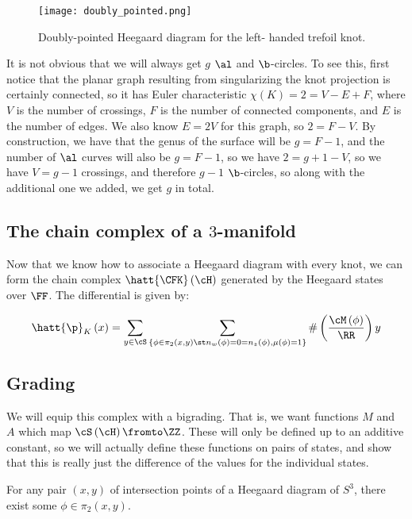 \documentclass{amsproc}
\begin{document}
\begin{figure}
\texttt{[image: doubly\_pointed.png]}
\caption{Doubly-pointed Heegaard diagram for the left-
handed trefoil knot.}
\label{fig:doubly_pointed}
\end{figure}

It is not obvious that we will always get $g$ $\al$ and $\b$-circles.
To see this, first notice that the planar graph resulting from singularizing the knot projection
is certainly connected, so it has Euler characteristic
$\chi\left( K \right) = 2 = V - E + F$, where $V$ is the number of crossings, 
$F$ is the number of connected components, and $E$ is the number of edges. 
We also know $E = 2V$ for this graph, so $2 = F - V$. By construction, we have that the genus of the
surface will be $g = F - 1$, and the number of $\al$ curves will also be $g = F-1$, so we have
$2 = g + 1 - V$, so we have $V = g - 1$ crossings, and therefore $g - 1$ $\b$-circles, so along with
the additional one we added, we get $g$ in total.

\subsection{The chain complex of a $3$-manifold}

Now that we know how to associate a Heegaard diagram with every knot, we can form
the chain complex $\hatt{\CFK}\left( \cH \right)$ generated by the Heegaard states
over $\FF$. The differential is given by:

\begin{equation}
\hatt{\p}_K\left( x \right) = 
\sum_{y\in \cS} \sum_{ \left\{ \phi \in \pi_2\left( x , y \right) \st
n_w\left( \phi \right) = 0 = n_z\left( \phi \right), \mu\left( \phi \right) =1\right\}}
\#\left( \frac{\cM\left( \phi \right)}{\RR} \right) y
\end{equation}


\subsection{Grading}

We will equip this complex with a bigrading. 
That is, we want functions $M$ and $A$
which map $\cS\left( \cH \right) \fromto \ZZ$.
These will only be defined up to an additive constant, so we will actually define 
these functions on pairs of states, and show that this is really just
the difference of the values for the individual states.

\begin{lem}
For any pair $\left( x,y \right)$ of intersection points of a Heegaard diagram of $S^3$, 
there exist some $\phi \in \pi_2\left( x , y \right)$.
\end{lem}
\end{document}
